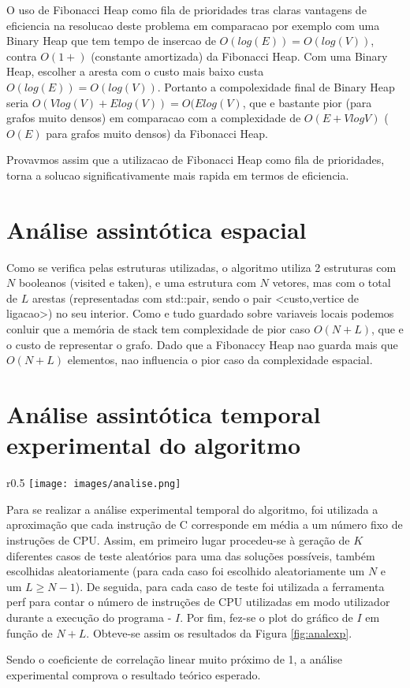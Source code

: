 \documentclass{scrartcl}
\begin{document}
O uso de Fibonacci Heap como fila de prioridades tras claras vantagens de eficiencia na resolucao deste problema em comparacao por exemplo com uma Binary Heap que tem tempo de insercao de $O(log(E)) = O(log(V))$, contra $O(1+)$ (constante amortizada) da Fibonacci Heap. Com uma Binary Heap, escolher a aresta com o custo mais baixo custa $O(log(E)) = O(log(V))$. Portanto a compolexidade final de Binary Heap seria $O(Vlog(V) + Elog(V)) =  O(Elog(V)$, que e bastante pior (para grafos muito densos) em comparacao com a complexidade de $O(E + V log V)$ ($O(E)$ para grafos muito densos) da Fibonacci Heap.

Provavmos assim que a utilizacao de Fibonacci Heap como fila de prioridades, torna a solucao significativamente mais rapida em termos de eficiencia.


\section*{Análise assintótica espacial}
Como se verifica pelas estruturas utilizadas, o algoritmo utiliza 2 estruturas com $N$ booleanos (visited e taken), e uma estrutura com $N$ vetores, mas com o total de $L$ arestas (representadas com std::pair, sendo o pair <custo,vertice de ligacao>) no seu interior. Como e tudo guardado sobre variaveis locais podemos conluir que a memória de stack tem complexidade de pior caso $O(N+L)$, que e o custo de representar o grafo. Dado que a Fibonaccy Heap nao guarda mais que $O(N+L)$ elementos, nao influencia o pior caso da complexidade espacial.


\section*{Análise assintótica temporal experimental do algoritmo}
\begin{wrapfigure}{r}{0.5\textwidth} %
	\centering
	\texttt{[image: images/analise.png]}
	\caption{Análise experimental com parâmetros $2 \le N \le 10000 $ (1000 riscos)}
	\label{fig:analexp}
\end{wrapfigure}
Para se realizar a análise experimental temporal do algoritmo, foi utilizada a aproximação que cada instrução de C corresponde em média a um número fixo de instruções de CPU. Assim, em primeiro lugar procedeu-se à geração de $K$ diferentes casos de teste aleatórios para uma das soluções possíveis, também escolhidas aleatoriamente (para cada caso foi escolhido aleatoriamente um $N$ e um $L\ge N-1$). De seguida, para cada caso de teste foi utilizada a ferramenta perf para contar o número de instruções de CPU utilizadas em modo utilizador durante a execução do programa - $I$. Por fim, fez-se o plot do gráfico de $I$ em função de $N+L$. Obteve-se assim os resultados da Figura \ref{fig:analexp}.\par
Sendo o coeficiente de correlação linear muito próximo de 1, a análise experimental comprova o resultado teórico esperado.


\end{document}
